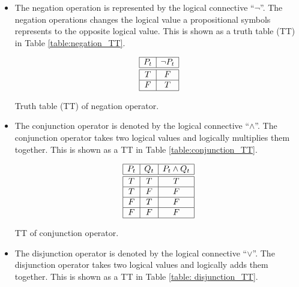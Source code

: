\begin{itemize}
	\item The negation operation is represented by the logical connective ``$\neg$''. The negation operations changes the logical value a propositional symbols represents to the opposite logical value. This is shown as a truth table (TT) in Table \ref{table:negation_TT}.

\begin{table}[H]
\begin{displaymath}  
		  \begin{array}{|c|c|}\hline
		    P_t & \neg P_t \\\hline\hline
		    T & F  \\\hline
		    F & T \\\hline
		  \end{array}
\end{displaymath}
\caption{Truth table (TT) of negation operator.}
\label{table:negation_TT}
\end{table}

\vspace{-1cm}
		
	\item The conjunction operator is denoted by the logical connective ``$\wedge$''. The conjunction operator takes two logical values and logically multiplies them together.  This is shown as a TT in Table \ref{table:conjunction_TT}.
	
	
\begin{table}[H]
\begin{displaymath}  
		  \begin{array}{|c|c|c|}\hline
		    P_t & Q_t &  P_t \wedge Q_t   \\\hline\hline
		    T & T & T\\\hline
		    T & F & F\\\hline
		    F & T & F\\\hline
		    F & F & F\\\hline
		  \end{array}
\end{displaymath}
\caption{TT of conjunction operator.}
\label{table:conjunction_TT}
\end{table}

\vspace{-1cm}	
	
	

	\item The disjunction operator is denoted by the logical connective ``$\vee$''. The disjunction operator takes two logical values and logically adds them together.  This is shown as a TT in Table \ref{table: disjunction_TT}.
	

\end{itemize}
